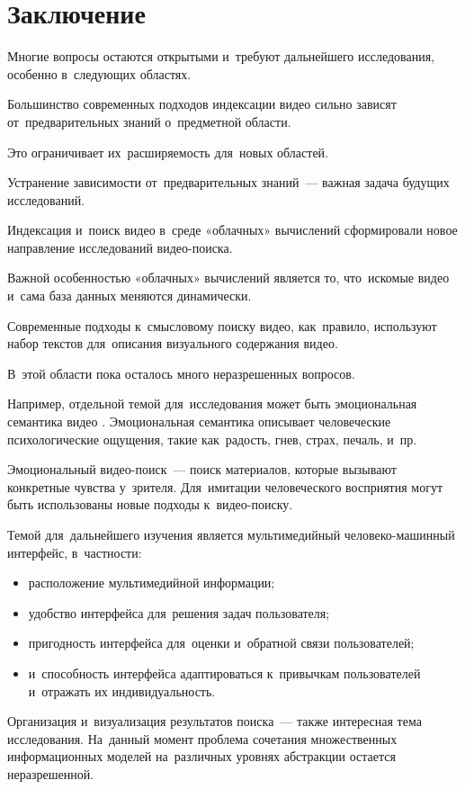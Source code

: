 
\section{Заключение}

Многие вопросы остаются открытыми и~требуют дальнейшего исследования,
особенно в~следующих областях.

Большинство современных подходов индексации видео сильно зависят
от~предварительных знаний о~предметной области.

Это ограничивает их~расширяемость для~новых областей. 

Устранение зависимости от~предварительных знаний~—
важная задача будущих исследований. 

Индексация и~поиск видео в~среде «облачных» вычислений сформировали
новое направление исследований видео-поиска.

Важной особенностью «облачных» вычислений является то,
что~искомые видео и~сама база данных меняются динамически.

Современные подходы к~смысловому поиску видео, как~правило,
используют набор текстов для~описания визуального содержания видео.

В~этой области пока осталось много неразрешенных вопросов. 

Например, отдельной темой для~исследования может быть
эмоциональная семантика видео \cite{Tamizharasan:2013}.
Эмоциональная семантика описывает человеческие психологические ощущения,
такие как~радость, гнев, страх, печаль, и~пр.

Эмоциональный видео-поиск~— поиск материалов,
которые вызывают конкретные чувства у~зрителя.
Для~имитации человеческого восприятия могут
быть использованы новые подходы к~видео-поиску.

Темой для~дальнейшего изучения является мультимедийный
человеко-машинный интерфейс, в~частности:
\begin{itemize}
    \item расположение мультимедийной информации; 
    \item удобство интерфейса для~решения задач пользователя; 
    \item пригодность интерфейса для~оценки и~обратной связи пользователей; 
    \item и~способность интерфейса адаптироваться к~привычкам пользователей
        и~отражать их индивидуальность. 
\end{itemize}

Организация и~визуализация результатов поиска~— также интересная
тема исследования. На~данный момент проблема сочетания множественных
информационных моделей на~различных уровнях абстракции остается неразрешенной.

